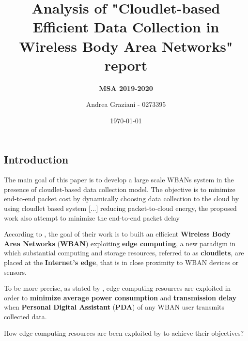 \documentclass[10pt]{beamer}
\title[] %
{ %
      \textbf{Analysis of "Cloudlet-based Efficient Data Collection in Wireless Body Area Networks" report}
}
\subtitle[]
{
      \textbf{MSA 2019-2020}
}
\author[Andrea Graziani - 0273395]
{      Andrea Graziani - 0273395 \\
      {}
}
\institute[]
{
      Università degli Studi di Roma “Tor Vergata” \\
      FACOLTA' DI INGEGNERIA \\
      Corso di Laurea Magistrale in Ingegneria Informatica
  
}
\date{\today}
\begin{document}

{%
\begin{frame}[plain,noframenumbering] %
  \titlepage %
\end{frame}}

\begin{frame} 

\section{Introduction}

\vspace{0.3cm}

\begin{quoting}[font=itshape, begintext={``}, endtext={''\cite[par.~1.4]{MSAReport}}]
The main goal of this paper is to develop a large scale WBANs system in the presence of cloudlet-based data collection model. The objective is to minimize end-to-end packet cost by dynamically choosing data collection to the cloud by using cloudlet based system [...] reducing packet-to-cloud energy, the proposed work also attempt to minimize the end-to-end packet delay
\end{quoting}

\vspace{0.3cm}

According to \citet{MSAReport}, the goal of their work is to built an efficient \textbf{Wireless Body Area Networks} (\textbf{WBAN}) exploiting \textbf{edge computing}, a new paradigm in which substantial computing and storage resources, referred to as \textbf{cloudlets}, are placed at the \textbf{Internet's edge}, that is in close proximity to WBAN devices or sensors.

To be more precise, as stated by \citet{MSAReport}, edge computing resources are exploited in order to \textbf{minimize average power consumption} and \textbf{transmission delay} when \textbf{Personal Digital Assistant} (\textbf{PDA}) of any WBAN user transmits collected data.



How edge computing resources are been exploited by \citet{MSAReport} to achieve their objectives? 

\end{frame} 
\end{document}
